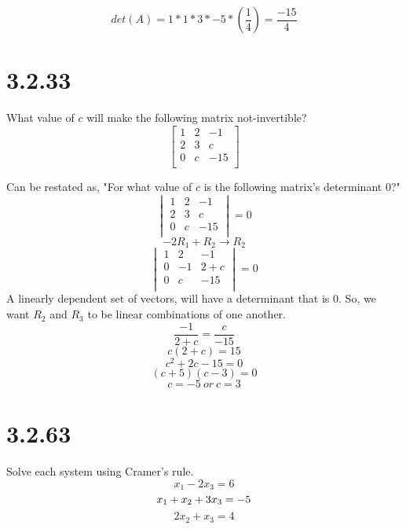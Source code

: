 \documentclass[journal]{IEEEtran}
\begin{document}
{			\[
				det(A) = 1*1*3*-5*(\frac{1}{4}) = \frac{-15}{4}
			\]
		\newpage
		\section*{\Large{\textbf{3.2.33}}}
			What value of $c$ will make the following matrix not-invertible?
			\[
				\begin{bmatrix}
					1&	2&	-1	\\
					2&	3&	c	\\
					0&	c&	-15	\\
				\end{bmatrix}
			\]

			Can be restated as, "For what value of $c$ is the following matrix's determinant $0$?"
			\[
				\begin{vmatrix}
					1&	2&	-1	\\
					2&	3&	c	\\
					0&	c&	-15	\\
				\end{vmatrix} = 0
			\]
			\[
				-2R_1+R_2 \rightarrow R_2
			\]
			\[
				\begin{vmatrix}
					1&	2&	-1	\\
					0&	-1&	2+c	\\
					0&	c&	-15	\\
				\end{vmatrix} = 0
			\]
			A linearly dependent set of vectors, will have a determinant that is $0$. So, we want $R_2$ and $R_3$ to be linear combinations of one another.
			\[
				\frac{-1}{2+c} = \frac{c}{-15}
			\]
			\[ c(2+c) = 15 \]
			\[ c^2 + 2c - 15 = 0 \]
			\[ (c+5)(c-3) = 0\]
			\[ c = -5\ or\ c = 3 \]
		\section*{\Large{\textbf{3.2.63}}}
			Solve each system using Cramer's rule.
			\[x_1-2x_3=6\]
			\[\-x_1+x_2+3x_3=-5\]
			\[2x_2+x_3=4\]

}
\end{document}
